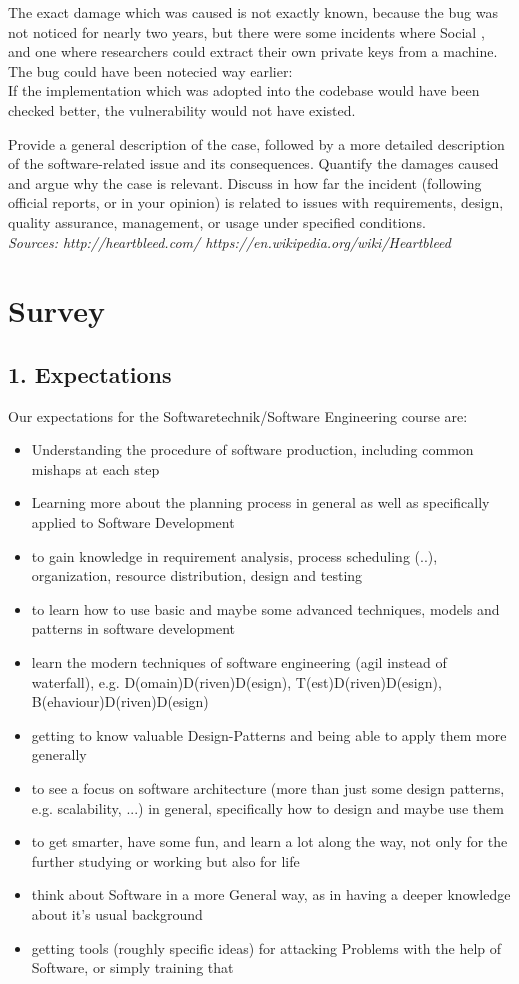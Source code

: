 \documentclass{scrartcl}
\begin{document}
The exact damage which was caused is not exactly known, because the bug was not noticed for nearly two years, but there were some incidents where
Social , and one where researchers could extract their own private keys from a machine.\\
The bug could have been notecied way earlier:\\
If the implementation which was adopted into the codebase would have been checked better, the vulnerability would not have existed.


Provide a general description of the case, followed by a more detailed description of the software-related issue and its consequences.
 Quantify the damages caused and argue why the case is relevant.
Discuss in how far the incident (following official reports, or in your opinion) is related to issues with
requirements, design, quality assurance, management, or usage under specified conditions.\\
\em Sources: http://heartbleed.com/ \hspace{1cm} https://en.wikipedia.org/wiki/Heartbleed
\em 
\section*{Survey}

\subsection*{1. Expectations}
Our expectations for the Softwaretechnik/Software Engineering course are:
\begin{itemize}
\item Understanding the procedure of software production, including common mishaps at each step
\item Learning more about the planning process in general as well as specifically applied to Software Development
\item to gain knowledge in requirement analysis, process scheduling (..), organization, resource distribution, design and testing
\item to learn how to use basic and maybe some advanced techniques, models and patterns in software development
\item learn the modern techniques of software engineering (agil instead of waterfall), e.g. D(omain)D(riven)D(esign), T(est)D(riven)D(esign), B(ehaviour)D(riven)D(esign)
\item getting to know valuable Design-Patterns and being able to apply them more generally
\item to see a focus on software architecture (more than just some design patterns, e.g. scalability, ...) in general, specifically how to design and maybe use them
\item to get smarter, have some fun, and learn a lot along the way, not only for the further studying or working but also for life
\item think about Software in a more General way, as in having a deeper knowledge about it's usual background
\item getting tools (roughly specific ideas) for attacking Problems with the help of Software, or simply training that
\end{itemize}
\end{document}

